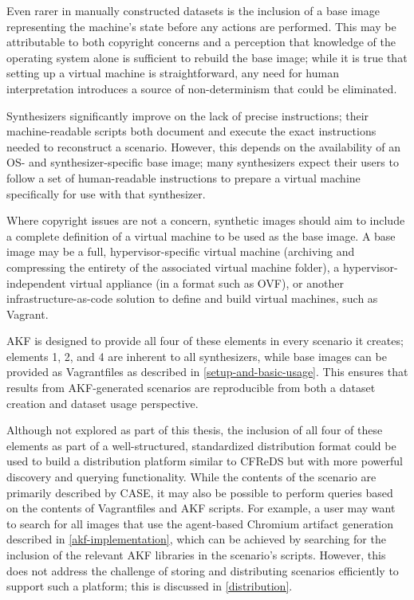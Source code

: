 \documentclass[letterpaper,12pt]{report}
\begin{document}
Even rarer in manually constructed datasets is the inclusion of a base
image representing the machine's state before any actions are performed.
This may be attributable to both copyright concerns and a perception
that knowledge of the operating system alone is sufficient to rebuild
the base image; while it is true that setting up a virtual machine is
straightforward, any need for human interpretation introduces a source
of non-determinism that could be eliminated.

Synthesizers significantly improve on the lack of precise instructions;
their machine-readable scripts both document and execute the exact
instructions needed to reconstruct a scenario. However, this depends on
the availability of an OS- and synthesizer-specific base image; many
synthesizers expect their users to follow a set of human-readable
instructions to prepare a virtual machine specifically for use with that
synthesizer.

Where copyright issues are not a concern, synthetic images should aim to
include a complete definition of a virtual machine to be used as the
base image. A base image may be a full, hypervisor-specific virtual
machine (archiving and compressing the entirety of the associated
virtual machine folder), a hypervisor-independent virtual appliance (in
a format such as OVF), or another infrastructure-as-code solution to
define and build virtual machines, such as Vagrant.

AKF is designed to provide all four of these elements in every scenario
it creates; elements 1, 2, and 4 are inherent to all synthesizers, while
base images can be provided as Vagrantfiles as described in \autoref{setup-and-basic-usage}. This ensures that
results from AKF-generated scenarios are reproducible from both a
dataset creation and dataset usage perspective.

Although not explored as part of this thesis, the inclusion of all four
of these elements as part of a well-structured, standardized
distribution format could be used to build a distribution platform
similar to CFReDS but with more powerful discovery and querying
functionality. While the contents of the scenario are primarily
described by CASE, it may also be possible to perform queries based on
the contents of Vagrantfiles and AKF scripts. For example, a user may
want to search for all images that use the agent-based Chromium artifact
generation described in \autoref{akf-implementation}, which can be achieved by searching for the inclusion of
the relevant AKF libraries in the scenario's scripts. However, this does
not address the challenge of storing and distributing scenarios
efficiently to support such a platform; this is discussed in
\autoref{distribution}.
\end{document}
